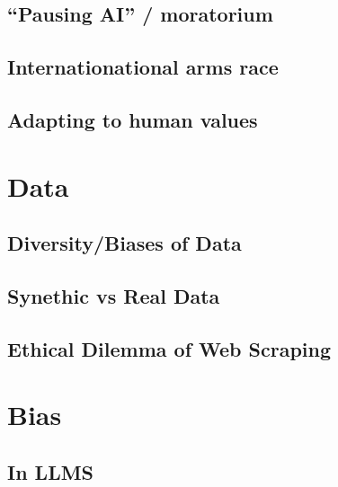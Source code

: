 \documentclass[
]{book}
\begin{document}
\hypertarget{pausing-ai-moratorium}{%
\section{``Pausing AI'' / moratorium}\label{pausing-ai-moratorium}}

\hypertarget{internationational-arms-race}{%
\section{Internationational arms race}\label{internationational-arms-race}}

\hypertarget{adapting-to-human-values}{%
\section{Adapting to human values}\label{adapting-to-human-values}}

\hypertarget{data}{%
\chapter{Data}\label{data}}

\hypertarget{diversitybiases-of-data}{%
\section{Diversity/Biases of Data}\label{diversitybiases-of-data}}

\hypertarget{synethic-vs-real-data}{%
\section{Synethic vs Real Data}\label{synethic-vs-real-data}}

\hypertarget{ethical-dilemma-of-web-scraping}{%
\section{Ethical Dilemma of Web Scraping}\label{ethical-dilemma-of-web-scraping}}

\hypertarget{bias}{%
\chapter{Bias}\label{bias}}

\hypertarget{in-llms}{%
\section{In LLMS}\label{in-llms}}
\end{document}
